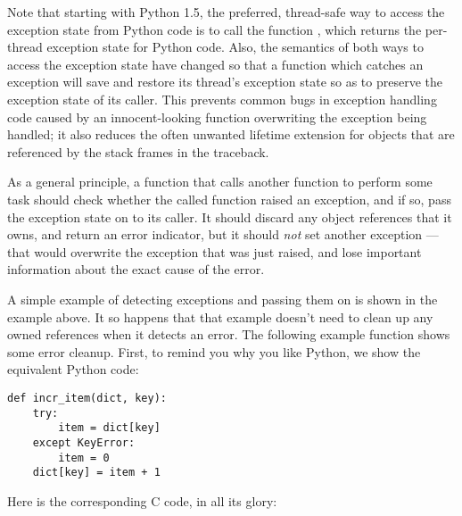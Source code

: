 \documentclass{manual}
\begin{document}
Note that starting with Python 1.5, the preferred, thread-safe way to 
access the exception state from Python code is to call the function
, which returns the per-thread exception state 
for Python code.  Also, the semantics of both ways to access the 
exception state have changed so that a function which catches an 
exception will save and restore its thread's exception state so as to 
preserve the exception state of its caller.  This prevents common bugs 
in exception handling code caused by an innocent-looking function 
overwriting the exception being handled; it also reduces the often 
unwanted lifetime extension for objects that are referenced by the 
stack frames in the traceback.

As a general principle, a function that calls another function to 
perform some task should check whether the called function raised an 
exception, and if so, pass the exception state on to its caller.  It 
should discard any object references that it owns, and return an 
error indicator, but it should \emph{not} set another exception ---
that would overwrite the exception that was just raised, and lose
important information about the exact cause of the error.

A simple example of detecting exceptions and passing them on is shown
in the  example
above.  It so happens that that example doesn't need to clean up any
owned references when it detects an error.  The following example
function shows some error cleanup.  First, to remind you why you like
Python, we show the equivalent Python code:

\begin{verbatim}
def incr_item(dict, key):
    try:
        item = dict[key]
    except KeyError:
        item = 0
    dict[key] = item + 1
\end{verbatim}

Here is the corresponding C code, in all its glory:
\end{document}
